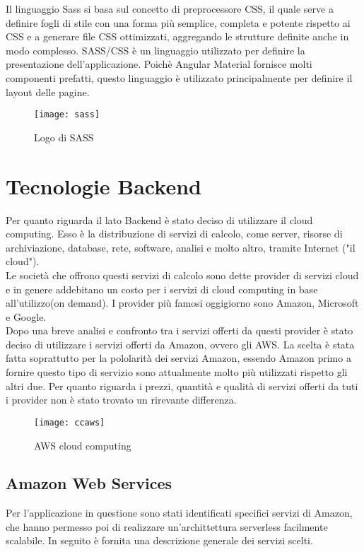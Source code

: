 Il linguaggio Sass si basa sul concetto di preprocessore CSS, il quale serve a definire fogli di stile con una forma più semplice, completa e potente rispetto ai CSS e a generare file CSS ottimizzati, aggregando le strutture definite anche in modo complesso. SASS/CSS è un linguaggio utilizzato per definire la presentazione dell'applicazione. Poichè Angular Material fornisce molti componenti prefatti, questo linguaggio è utilizzato principalmente per definire il layout delle pagine. 
\begin{figure}[!h] 
	\centering 
	\texttt{[image: sass]}
	\caption{Logo di SASS}
\end{figure}

\section{Tecnologie Backend}
Per quanto riguarda il lato Backend è stato deciso di utilizzare il cloud computing. Esso è la distribuzione di servizi di calcolo, come server, risorse di archiviazione, database, rete, software, analisi e molto altro, tramite Internet ("il cloud"). 
\\

Le società che offrono questi servizi di calcolo sono dette provider di servizi cloud e in genere addebitano un costo per i servizi di cloud computing in base all'utilizzo(on demand). I provider più famosi oggigiorno sono Amazon, Microsoft e Google. 
\\

Dopo una breve analisi e confronto tra i servizi offerti da questi provider è stato deciso di utilizzare i servizi offerti da Amazon, ovvero gli AWS. La scelta è stata fatta soprattutto per la pololarità dei servizi Amazon, essendo Amazon primo a fornire questo tipo di servizio sono attualmente molto più utilizzati rispetto gli altri due. Per quanto riguarda i prezzi, quantità e qualità di servizi offerti da tuti i provider non è stato trovato un rirevante differenza. 
\begin{figure}[!h] 
	\centering 
	\texttt{[image: ccaws]}
	\caption{AWS cloud computing}
\end{figure} 
\subsection{Amazon Web Services}
Per l'applicazione in questione sono stati identificati specifici servizi di Amazon, che hanno permesso poi di realizzare un'archittettura serverless facilmente scalabile. In seguito è fornita una descrizione generale dei servizi scelti.

